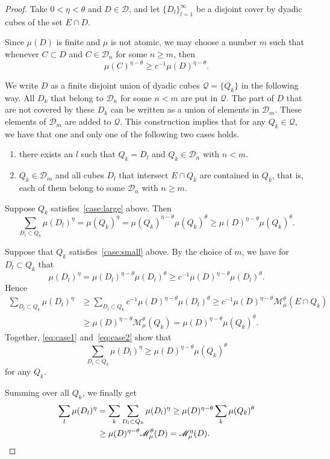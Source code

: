 \documentclass[11pt]{article}
\theoremstyle{definition}
\numberwithin{equation}{section}
\numberwithin{figure}{section}
\numberwithin{table}{section}
\begin{document}
\begin{proof}
Take $0 < \eta < \theta$ and $D \in \mathscr{D}$, and let $\{D_l\}_{l=1}^\infty$ be a disjoint cover by dyadic cubes of the set $E \cap D$.

Since $\mu (D)$ is finite and $\mu$ is not atomic, we may choose a number $m$ such that whenever $C \subset D$ and $C \in
\mathscr{D}_n$ for some $n \geq m$, then
\[
\mu (C)^{\eta-\theta} \geq c^{-1} \mu (D)^{\eta-\theta}.
\]

We write $D$ as a finite disjoint union of dyadic cubes $\mathscr{Q} = \{Q_k\}$ in the following way. All $D_k$ that belong to $\mathscr{D}_{n}$ for some $n < m$ are put in $\mathscr{Q}$. The part of $D$ that are not covered by these $D_k$ can be written as a union of elements in $\mathscr{D}_m$. These elements of $\mathscr{D}_m$ are added to $\mathscr{Q}$. This construction implies that for any $Q_k \in \mathscr{Q}$, we have that one and only one of the following two cases holds.
\renewcommand{\theenumi}{\roman{enumi}}
\begin{enumerate}
\item \label{case:large}
there exists an $l$ such that $Q_k = D_l$ and $Q_k \in
\mathscr{D}_n$ with $n < m$.
\item \label{case:small}
$Q_k \in \mathscr{D}_m$ and all cubes $D_l$ that intersect $E
\cap Q_k$ are contained in $Q_k$, that is, each of them belong to some $\mathscr{D}_n$ with $n \geq m$.
\end{enumerate}

Suppose $Q_k$ satisfies~\eqref{case:large} above. Then
\begin{equation}\label{eq:case1}
\sum_{D_l \subset Q_k} \mu (D_l)^\eta = \mu (Q_k)^\eta = \mu (Q_k)^{\eta-\theta} \mu (Q_k)^\theta \geq \mu (D)^{\eta-\theta}
\mu (Q_k)^\theta.
\end{equation}

Suppose that $Q_k$ satisfies~\eqref{case:small} above. By the choice of $m$, we have for $D_l \subset Q_k$ that
\[
\mu (D_l)^\eta = \mu (D_l)^{\eta-\theta} \mu (D_l)^\theta \geq c^{-1} \mu (D)^{\eta-\theta} \mu (D_l)^\theta.
\]
Hence
\begin{align}
\sum_{D_l \subset Q_k} \mu (D_l)^\eta &\geq \sum_{D_l \subset Q_k} c^{-1} \mu (D)^{\eta-\theta} \mu (D_l)^\theta \geq c^{-1} \mu (D)^{\eta-\theta} \mathscr{M}_\mu^\theta (E \cap Q_k) \nonumber
\\ &\geq \mu (D)^{\eta-\theta} \mathscr{M}_\mu^\theta (Q_k) = \mu (D)^{\eta-\theta} \mu (Q_k)^\theta. \label{eq:case2}
\end{align}
Together, \eqref{eq:case1} and~\eqref{eq:case2} show that
\[
\sum_{D_l \subset Q_k} \mu (D_l)^\eta \geq \mu (D)^{\eta-\theta} \mu (Q_k)^\theta
\]
for any $Q_k$.

Summing over all $Q_k$, we finally get
\begin{align*}
\sum_l \mu (D_l)^\eta &= \sum_k \sum_{D_l \subset Q_k} \mu (D_l)^\eta \geq \mu (D)^{\eta-\theta} \sum_k \mu (Q_k)^\theta
\\ &\geq \mu (D)^{\eta-\theta} \mathscr{M}_\mu^\theta (D) =
\mathscr{M}_\mu^\eta (D). \qedhere
\end{align*}
\end{proof}
\end{document}
